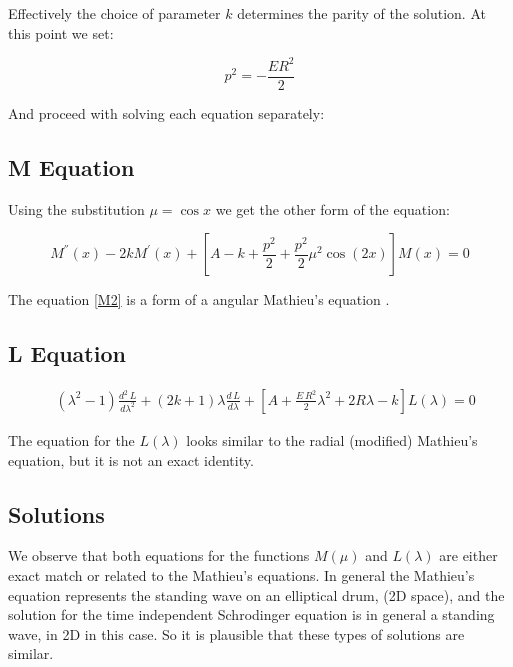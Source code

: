 Effectively the choice of parameter $ k $ determines the parity of the solution. At this point we set:

\begin{equation}
p^2 = -\frac{ER^2}{2}
\end{equation}

And proceed with solving each equation separately:

\subsection{ M Equation }

Using the substitution $ \mu = \cos x $ we get the other form of the equation:

\begin{equation}\label{M2}
M^{''}(x) - 2k M^{'}(x) +   \left[ A - k + \frac{p^2}{2} + \frac{p^2}{2}\mu^2\cos(2x)  \right]M(x) = 0
\end{equation}

The equation \eqref{M2} is a form of a angular Mathieu's equation \cite{Mathieu2}. 

\subsection{ L Equation }

\begin{equation}\label{L2-2}
\begin{split}
& (\lambda^2-1)\frac{d^2\,L}{d\lambda^2} + (2k+1)\lambda \frac{d\,L}{d\lambda} +  \left[A + \frac{E\,R^2}{2}\lambda^2 + 2R\lambda  -k \right]L(\lambda) = 0
\end{split}
\end{equation}

The equation for the $ L(\lambda) $ looks similar to the radial (modified) Mathieu's equation, but it is not an exact identity. 

\subsection{Solutions}

We observe that both equations for the functions $ M(\mu) $ and $ L(\lambda) $ are either exact match or related to the Mathieu's equations. In general the Mathieu's equation represents the standing wave on an elliptical drum, (2D space), and the solution for the time independent Schrodinger equation is in general a standing wave, in 2D in this case. So it is plausible that these types of solutions are similar.

